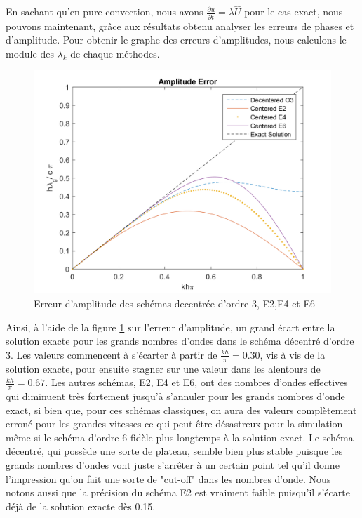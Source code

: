 \documentclass{article}
\begin{document}
En sachant qu'en pure convection, nous avons $ \frac{\partial u}{\partial t} = \lambda \widehat{U}$ pour le cas exact, nous pouvons maintenant, grâce aux résultats obtenu analyser les erreurs de phases et d'amplitude. Pour obtenir le graphe des erreurs d'amplitudes, nous calculons le module des $\lambda_k$ de chaque méthodes.
\begin{figure}[H]
    \centering
    \includegraphics[scale=0.55]{img/fig1.png}
    \caption{Erreur d'amplitude des schémas decentrée d'ordre 3, E2,E4 et E6}
    \label{fig1}
\end{figure}
Ainsi, à l'aide de la figure \ref{fig1} sur l'erreur d'amplitude, un grand écart entre la solution exacte pour les grands nombres d'ondes dans le schéma décentré d'ordre 3. Les valeurs commencent à s'écarter à partir de $\frac{kh}{\pi}  = 0.30$, vis à vis de la solution exacte, pour ensuite stagner sur une valeur dans les alentours de $\frac{kh}{\pi}  = 0.67$. Les autres schémas, E2, E4 et E6, ont des nombres d'ondes effectives qui diminuent très fortement jusqu'à s'annuler pour les grands nombres d'onde exact, si bien que, pour ces schémas classiques, on aura des valeurs complètement erroné pour les grandes vitesses ce qui peut être désastreux pour la simulation même si le schéma d'ordre 6 fidèle plus longtemps à la solution exact. Le schéma décentré, qui possède une sorte de plateau, semble bien plus stable puisque les grands nombres d'ondes vont juste s'arrêter à un certain point tel qu'il donne l'impression qu'on fait une sorte de "cut-off" dans les nombres d'onde. Nous notons aussi que la précision du schéma E2 est vraiment faible puisqu'il s'écarte déjà de la solution exacte dès 0.15. \\
\end{document}
